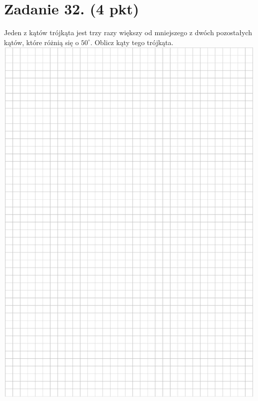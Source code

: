 \documentclass[10pt]{article}
\begin{document}
\section*{Zadanie 32. (4 pkt)}
Jeden z kątów trójkąta jest trzy razy większy od mniejszego z dwóch pozostałych kątów, które różnią się o \(50^{\circ}\). Oblicz kąty tego trójkąta.\\
\includegraphics[max width=\textwidth, center]{2024_11_21_779b7f825da3a12753feg-18}\\
\end{document}
